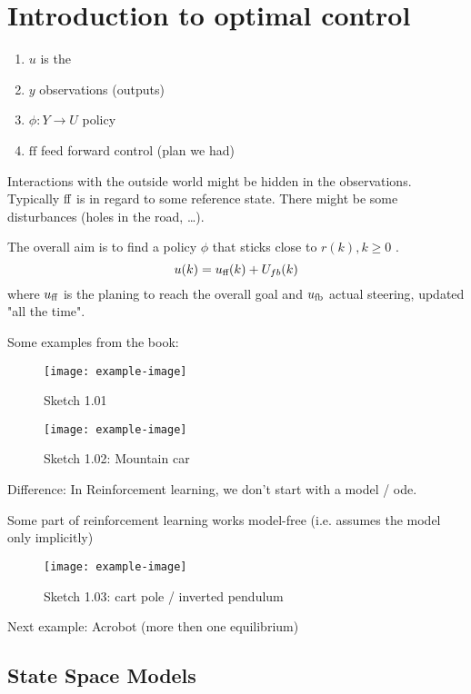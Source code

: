 \chapter{Introduction to optimal control}

\begin{enumerate}
    \item $u$ is the  
    \item $y$ observations (outputs)
    \item $\phi:Y\to U$ policy
    \item $\text{ff}$ feed forward control (plan we had)
\end{enumerate}

Interactions with the outside world might be hidden in the observations. Typically ${\text{ff}}$ is 
in regard to some reference state. There might be some disturbances (holes in the road, \dots).

The overall aim is to find a policy \(\phi\) that sticks close to $r(k),k\geq 0$ .
\[u(k)=u_{\text{ff}}(k)+U_{fb}(k)\]
where $u_{\text{ff}}$ is the planing to reach the overall goal and $u_{{\text{fb}}}$ actual steering, updated "all the time".

Some examples from the book:

\begin{figure}[H]\label{fig:1.01}
    \centering
    \texttt{[image: example-image]}
    \caption{Sketch 1.01}
\end{figure}

\begin{figure}[H]\label{fig:1.02}
    \centering
    \texttt{[image: example-image]}
    \caption{Sketch 1.02: Mountain car}
\end{figure}

Difference: In Reinforcement learning, we don't start with a model / ode. 

Some part of reinforcement learning works model-free (i.e. assumes the model only implicitly)

\begin{figure}[H]\label{fig:1.03}
    \centering
    \texttt{[image: example-image]}
    \caption{Sketch 1.03: cart pole / inverted pendulum}
\end{figure}

Next example: Acrobot (more then one equilibrium)

\section{State Space Models}

